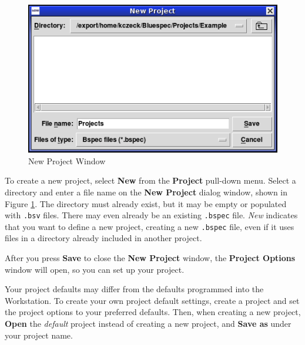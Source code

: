 \documentclass{article}
\newcommand{\te}[1]{\texttt{#1}}
\begin{document}
\begin{figure}[ht]
\begin{center}
\includegraphics[width = 3 in]{figures/newproject}
\caption{New Project Window}
\label{fig-new}
\end{center}
\end{figure}

To create a new project,  select {\bf New} from the {\bf Project} pull-down
menu.  Select a directory and enter a file name on  the {\bf New Project} dialog window, shown in Figure \ref{fig-new}.
The directory must already exist, but it may be empty or
 populated with
\te{.bsv} files.  There may even already be an existing \te{.bspec}
file.  {\em New} indicates that you want to define a new project,
creating  a new \te{.bspec} file, even if it uses files in a directory already
included in another project.


After you press {\bf Save} to close the {\bf New Project} window, the
{\bf Project Options} window will open, so you can set up your project.

Your project defaults may differ from the defaults programmed into
the Workstation.  To create your own project default settings, create a 
project and set the project options to  your preferred defaults.   Then, when
creating a new project, {\bf Open} the {\em default} project instead
of creating a new project, and {\bf Save as} under your project name.

\end{document}
